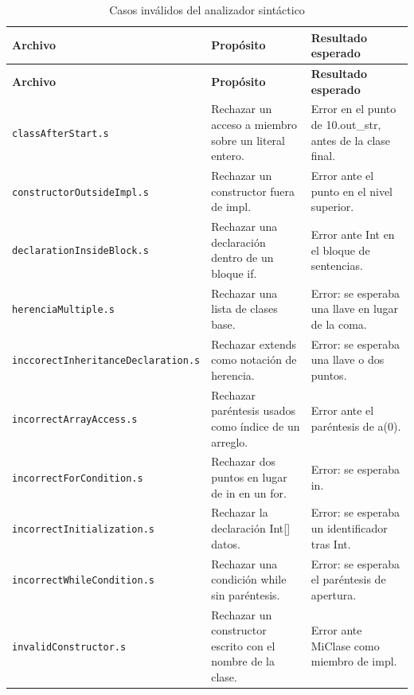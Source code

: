 \begingroup
\small
\renewcommand{\arraystretch}{1.2}
\setlength{\tabcolsep}{5pt}
\setlength{\LTleft}{0pt}
\setlength{\LTright}{0pt plus 1fill}
\begin{longtable}{|
>{\raggedright\arraybackslash}p{}|
>{\raggedright\arraybackslash}p{}|
>{\raggedright\arraybackslash}p{}|}
\caption{Casos inválidos del analizador sintáctico}\label{tab:sintactico-invalidos}\\
\hline
\textbf{Archivo} & \textbf{Propósito} & \textbf{Resultado esperado} \\ \hline
\endfirsthead
\hline
\textbf{Archivo} & \textbf{Propósito} & \textbf{Resultado esperado} \\ \hline
\endhead
\texttt{classAfterStart\allowbreak .s} & Rechazar un acceso a miembro sobre un literal entero. & Error en el punto de 10.out\_str, antes de la clase final. \\ \hline
\texttt{constructorOutsideImpl\allowbreak .s} & Rechazar un constructor fuera de impl. & Error ante el punto en el nivel superior. \\ \hline
\texttt{declarationInsideBlock\allowbreak .s} & Rechazar una declaración dentro de un bloque if. & Error ante Int en el bloque de sentencias. \\ \hline
\texttt{herenciaMultiple\allowbreak .s} & Rechazar una lista de clases base. & Error: se esperaba una llave en lugar de la coma. \\ \hline
\texttt{inccorectInheritanceDeclaration\allowbreak .s} & Rechazar extends como notación de herencia. & Error: se esperaba una llave o dos puntos. \\ \hline
\texttt{incorrectArrayAccess\allowbreak .s} & Rechazar paréntesis usados como índice de un arreglo. & Error ante el paréntesis de a(0). \\ \hline
\texttt{incorrectForCondition\allowbreak .s} & Rechazar dos puntos en lugar de in en un for. & Error: se esperaba in. \\ \hline
\texttt{incorrectInitialization\allowbreak .s} & Rechazar la declaración Int[] datos. & Error: se esperaba un identificador tras Int. \\ \hline
\texttt{incorrectWhileCondition\allowbreak .s} & Rechazar una condición while sin paréntesis. & Error: se esperaba el paréntesis de apertura. \\ \hline
\texttt{invalidConstructor\allowbreak .s} & Rechazar un constructor escrito con el nombre de la clase. & Error ante MiClase como miembro de impl. \\ \hline

\end{longtable}
